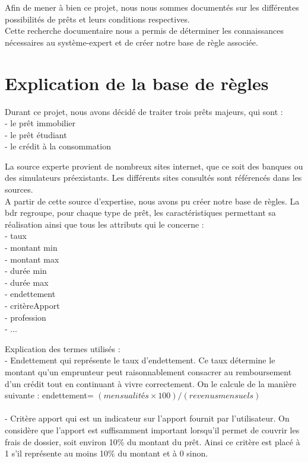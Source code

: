 \documentclass[
]{article}
\begin{document}
Afin de mener à bien ce projet, nous nous sommes documentés sur les
différentes possibilités de prêts et leurs conditions respectives.\\
Cette recherche documentaire nous a permis de déterminer les
connaissances nécessaires au système-expert et de créer notre base de
règle associée.

\pagebreak

\hypertarget{explication-de-la-base-de-ruxe8gles}{%
\section{Explication de la base de
règles}\label{explication-de-la-base-de-ruxe8gles}}

Durant ce projet, nous avons décidé de traiter trois prêts majeurs, qui
sont :\\
\tabto{1cm} - le prêt immobilier\\
\tabto{1cm} - le prêt étudiant\\
\tabto{1cm} - le crédit à la consommation

La source experte provient de nombreux sites internet, que ce soit des
banques ou des simulateurs préexistants. Les différents sites consultés
sont référencés dans les sources.\\
A partir de cette source d'expertise, nous avons pu créer notre base de
règles. La bdr regroupe, pour chaque type de prêt, les caractéristiques
permettant sa réalisation ainsi que tous les attributs qui le concerne
:\\
\tabto{1cm} - taux\\
\tabto{1cm} - montant min\\
\tabto{1cm} - montant max\\
\tabto{1cm} - durée min\\
\tabto{1cm} - durée max\\
\tabto{1cm} - endettement\\
\tabto{1cm} - critèreApport\\
\tabto{1cm} - profession\\
\tabto{1cm} - ...

Explication des termes utilisés : \\
\tabto{0.5cm} - Endettement qui représente le taux d'endettement. Ce taux détermine le montant qu'un emprunteur peut
raisonnablement consacrer au remboursement d'un crédit tout en
continuant à vivre correctement. On le calcule de la manière suivante :
endettement= $(mensualités ×100)/(revenus mensuels)$ \\ \\
\tabto{0.5cm} - Critère apport qui est un indicateur sur l'apport fournit par l'utilisateur. On considère
que l'apport est suffisamment important lorsqu'il permet de couvrir les
frais de dossier, soit environ 10\% du montant du prêt. Ainsi ce critère
est placé à 1 s'il représente au moins 10\% du montant et à 0 sinon.
\end{document}

